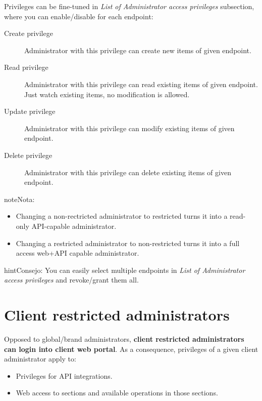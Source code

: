 \documentclass[letterpaper,10pt,spanish]{sphinxmanual}
\begin{document}
Privileges can be fine-tuned in \emph{List of Administrator access privileges} subsection, where you can enable/disable
for each endpoint:
\begin{description}
\item[{Create privilege}] \leavevmode{}\label{api_rest/acls:term-create-privilege}
Administrator with this privilege can create new items of given endpoint.

\item[{Read privilege}] \leavevmode{}\label{api_rest/acls:term-read-privilege}
Administrator with this privilege can read existing items of given endpoint. Just watch existing items, no
modification is allowed.

\item[{Update privilege}] \leavevmode{}\label{api_rest/acls:term-update-privilege}
Administrator with this privilege can modify existing items of given endpoint.

\item[{Delete privilege}] \leavevmode{}\label{api_rest/acls:term-delete-privilege}
Administrator with this privilege can delete existing items of given endpoint.

\end{description}

\begin{notice}{note}{Nota:}\begin{itemize}
\item {} 
Changing a non-rectricted administrator to restricted turns it into a read-only API-capable administrator.

\item {} 
Changing a restricted administrator to non-restricted turns it into a full access web+API capable administrator.

\end{itemize}
\end{notice}

\begin{notice}{hint}{Consejo:}
You can easily select multiple endpoints in \emph{List of Administrator access privileges} and revoke/grant them all.
\end{notice}


\section{Client restricted administrators}
\label{api_rest/acls:client-restricted-administrators}
Opposed to global/brand administrators, \textbf{client restricted administrators can login into client web portal}. As a
consequence, privileges of a given client administrator apply to:
\begin{itemize}
\item {} 
Privileges for API integrations.

\item {} 
Web access to sections and available operations in those sections.

\end{itemize}
\end{document}
